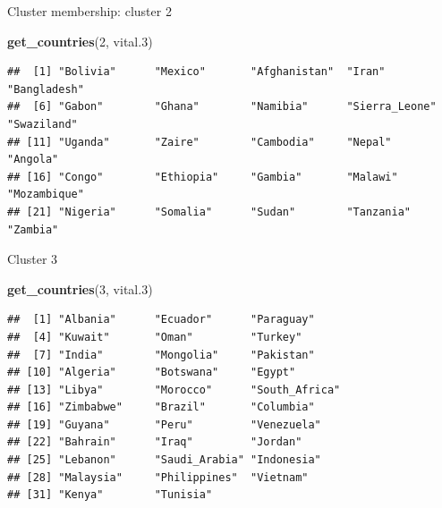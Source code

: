 \documentclass[
  ignorenonframetext,
]{beamer}
\newenvironment{Shaded}{\begin{snugshade}}{\end{snugshade}}
\newcommand{\DecValTok}[1]{\textcolor[rgb]{0.00,0.00,0.81}{#1}}
\newcommand{\FloatTok}[1]{\textcolor[rgb]{0.00,0.00,0.81}{#1}}
\newcommand{\KeywordTok}[1]{\textcolor[rgb]{0.13,0.29,0.53}{\textbf{#1}}}
\newcommand{\NormalTok}[1]{#1}
\begin{document}
\begin{frame}[fragile]{Cluster membership: cluster 2}
\protect\hypertarget{cluster-membership-cluster-2}{}

\scriptsize

\begin{Shaded}
\begin{Highlighting}[]
\KeywordTok{get_countries}\NormalTok{(}\DecValTok{2}\NormalTok{, vital}\FloatTok{.3}\NormalTok{)}
\end{Highlighting}
\end{Shaded}

\begin{verbatim}
##  [1] "Bolivia"      "Mexico"       "Afghanistan"  "Iran"         "Bangladesh"  
##  [6] "Gabon"        "Ghana"        "Namibia"      "Sierra_Leone" "Swaziland"   
## [11] "Uganda"       "Zaire"        "Cambodia"     "Nepal"        "Angola"      
## [16] "Congo"        "Ethiopia"     "Gambia"       "Malawi"       "Mozambique"  
## [21] "Nigeria"      "Somalia"      "Sudan"        "Tanzania"     "Zambia"
\end{verbatim}

\normalsize

\end{frame}

\begin{frame}[fragile]{Cluster 3}
\protect\hypertarget{cluster-3}{}

\begin{Shaded}
\begin{Highlighting}[]
\KeywordTok{get_countries}\NormalTok{(}\DecValTok{3}\NormalTok{, vital}\FloatTok{.3}\NormalTok{)}
\end{Highlighting}
\end{Shaded}

\begin{verbatim}
##  [1] "Albania"      "Ecuador"      "Paraguay"    
##  [4] "Kuwait"       "Oman"         "Turkey"      
##  [7] "India"        "Mongolia"     "Pakistan"    
## [10] "Algeria"      "Botswana"     "Egypt"       
## [13] "Libya"        "Morocco"      "South_Africa"
## [16] "Zimbabwe"     "Brazil"       "Columbia"    
## [19] "Guyana"       "Peru"         "Venezuela"   
## [22] "Bahrain"      "Iraq"         "Jordan"      
## [25] "Lebanon"      "Saudi_Arabia" "Indonesia"   
## [28] "Malaysia"     "Philippines"  "Vietnam"     
## [31] "Kenya"        "Tunisia"
\end{verbatim}

\end{frame}
\end{document}
